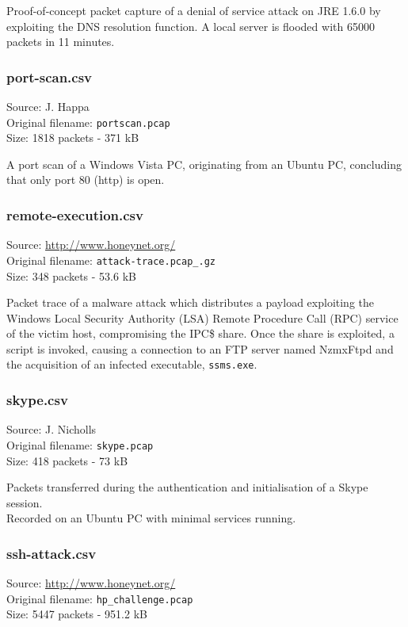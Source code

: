 \documentclass[12pt,a4paper]{article}
\begin{document}
	Proof-of-concept packet capture of a denial of service
	attack on JRE 1.6.0 by exploiting the DNS resolution
	function. A local server is flooded with 65000 packets in
	11 minutes.
	
	\subsubsection*{port-scan.csv}
	Source: J. Happa\\
	Original filename: \verb!portscan.pcap!\\
	Size: 1818 packets - 371 kB

	A port scan of a Windows Vista PC, originating from an
	Ubuntu PC, concluding that only port 80 (http) is open.
	
	\subsubsection*{remote-execution.csv}
	Source: \url{http://www.honeynet.org/}\\
	Original filename: \verb!attack-trace.pcap_.gz!\\
	Size: 348 packets - 53.6 kB

	Packet trace of a malware attack which distributes a
	payload exploiting the Windows Local Security Authority
	(LSA) Remote Procedure Call (RPC) service of the victim
	host, compromising the IPC\$ share. Once the share is
	exploited, a script is invoked, causing a connection to an
	FTP server named NzmxFtpd and the acquisition of an
	infected executable, \verb!ssms.exe!.
	
	\subsubsection*{skype.csv}
	Source: J. Nicholls\\
	Original filename: \verb|skype.pcap|\\
	Size: 418 packets - 73 kB

	Packets transferred during the authentication and
	initialisation of a Skype session.\\ Recorded on an Ubuntu
	PC with minimal services running.
	
	\subsubsection*{ssh-attack.csv}
	Source: \url{http://www.honeynet.org/}\\
	Original filename: \verb|hp_challenge.pcap|\\
	Size: 5447 packets - 951.2 kB
\end{document}
